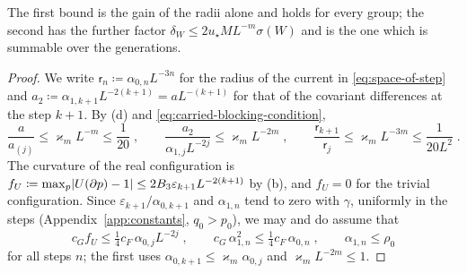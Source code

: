 \documentclass[11pt]{preprint}
\DeclarePairedDelimiter{\abs}{\lvert}{\rvert}
\numberwithin{equation}{section}
\theoremstyle{definition}
\theoremstyle{remark}
\theoremstyle{plain}
\begin{document}
The first bound is the gain of the radii alone and holds for every group; the second has the further factor $\delta_W \leq 2u_\star ML^{-m}\sigma(W)$ and is the one which is summable over the generations.

\begin{proof}
We write $\mathsf r_n \coloneqq \alpha_{0,n}L^{-3n}$ for the radius of the current in \eqref{eq:space-of-step} and $a_2 \coloneqq \alpha_{1,k+1}L^{-2(k+1)} = aL^{-(k+1)}$ for that of the covariant differences at the step $k + 1$. By (d) and \eqref{eq:carried-blocking-condition},
\begin{equation}\label{eq:carried-ratios}
    \frac{a}{a_{(j)}} \leq \varkappa_mL^{-m} \leq \frac{1}{20}\;,
    \qquad
    \frac{a_2}{\alpha_{1,j}L^{-2j}} \leq \varkappa_mL^{-2m}\;,
    \qquad
    \frac{\mathsf r_{k+1}}{\mathsf r_j} \leq \varkappa_mL^{-3m} \leq \frac{1}{20L^2}\;.
\end{equation}
The curvature of the real configuration is $f_U \coloneqq \max_p\abs{U(\partial p) - 1} \leq 2B_3\varepsilon_{k+1}L^{-2(k+1)}$ by (b), and $f_U = 0$ for the trivial configuration. Since $\varepsilon_{k+1}/\alpha_{0,k+1}$ and $\alpha_{1,n}$ tend to zero with $\gamma$, uniformly in the steps (Appendix~\ref{app:constants}, $q_0 > p_0$), we may and do assume that
\begin{equation}\label{eq:carried-smallness}
    c_Gf_U \leq \tfrac14c_F\,\alpha_{0,j}L^{-2j}\;,
    \qquad
    c_G\,\alpha_{1,n}^2 \leq \tfrac14c_F\,\alpha_{0,n}\;,
    \qquad
    \alpha_{1,n} \leq \rho_0
\end{equation}
for all steps $n$; the first uses $\alpha_{0,k+1} \leq \varkappa_m\alpha_{0,j}$ and $\varkappa_mL^{-2m} \leq 1$.


\end{proof}
\end{document}
